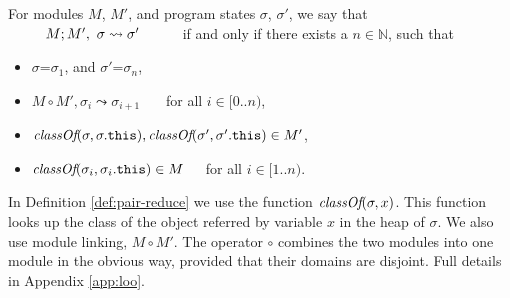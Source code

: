 \begin{definition}
\label{def:pair-reduce}
For  
  modules $M$,  $M'$, and program states $\sigma$, $\sigma'$, 
we say that $\ \ \ \ \ \ \ \ \reduction{M}{M'}{\sigma}{\sigma'}\ \ \ \ \ \ \ \ $ if and only if there exists a 
$n\in\mathbb{N}$, such that
\begin{itemize}
\item
$\sigma$=$\sigma_1$, and  $\sigma'$=$\sigma_n$,
\item
$M \circ M', \sigma_i \leadsto \sigma_{i+1}$  \ \ \ for all $i\in [0..n)$,
\item
$\textit{classOf}(\sigma, \sigma.{\texttt{this}}), \textit{classOf}(\sigma', \sigma'.{\texttt{this}})\in M'$,
\item
$\textit{classOf}(\sigma_i, \sigma_i.{\texttt{this}}) \in M$\ \ \ for all $i\in [1..n)$.
\end{itemize} 
%
\end{definition}
In Definition \ref{def:pair-reduce}  %
we  use  the function
$\textit{classOf}(\sigma, x)$. This function looks up 
the class of   the object referred by variable $x$ in the heap of $\sigma$. 
We also use module linking, $M\circ M'$. The operator $\circ$
combines the two modules into one module in the obvious way, provided that their 
domains are disjoint.
Full details in  Appendix \ref{app:loo}.
